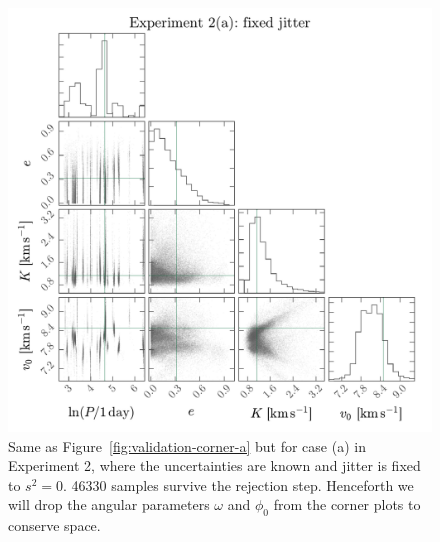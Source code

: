 \documentclass[manuscript, letterpaper]{aastex6}
\newcommand{\figname}{Figure}
\begin{document}
\begin{figure}[p]
\begin{center}
\includegraphics[width=\textwidth]{figures/undunc-corner-a.pdf}
\end{center}
\caption{%
Same as \figname~\ref{fig:validation-corner-a} but for case (a) in Experiment 2, where the
uncertainties are known and jitter is fixed to $s^2 = 0$.
46330 samples survive the rejection step.
Henceforth we will drop the angular parameters $\omega$ and $\phi_0$ from the
corner plots to conserve space.
\label{fig:undunc-corner-a}}
\end{figure}
\end{document}

